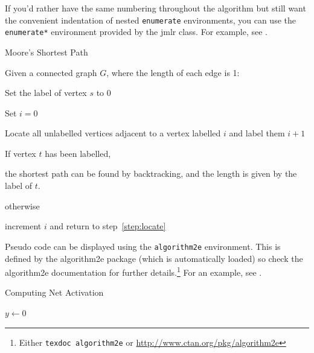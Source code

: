 \documentclass[pmlr]{jmlr}%
\begin{document}
If you'd rather have the same numbering throughout the algorithm
but still want the convenient indentation of nested 
\texttt{enumerate} environments, you can use the
\texttt{enumerate*} environment provided by the \textsf{jmlr}
class. For example, see .

\begin{algorithm}
\caption{Moore's Shortest Path}\label{alg:moore}
Given a connected graph $G$, where the length of each edge is 1:
\begin{enumerate*}
  \item Set the label of vertex $s$ to 0
  \item Set $i=0$
  \begin{enumerate*}
    \item \label{step:locate}Locate all unlabelled vertices 
          adjacent to a vertex labelled $i$ and label them $i+1$
    \item If vertex $t$ has been labelled,
    \begin{enumerate*}
      \item[] the shortest path can be found by backtracking, and 
      the length is given by the label of $t$.
    \end{enumerate*}
    otherwise
    \begin{enumerate*}
      \item[] increment $i$ and return to step~\ref{step:locate}
    \end{enumerate*}
  \end{enumerate*}
\end{enumerate*}
\end{algorithm}

Pseudo code can be displayed using the \texttt{algorithm2e}
environment. This is defined by the \textsf{algorithm2e} package
(which is automatically loaded) so check the \textsf{algorithm2e}
documentation for further details.\footnote{Either \texttt{texdoc
algorithm2e} or \url{http://www.ctan.org/pkg/algorithm2e}}
For an example, see .

\begin{algorithm2e}
\caption{Computing Net Activation}
\label{alg:net}
{}
$y\leftarrow 0$\;
\end{algorithm2e}
\end{document}
